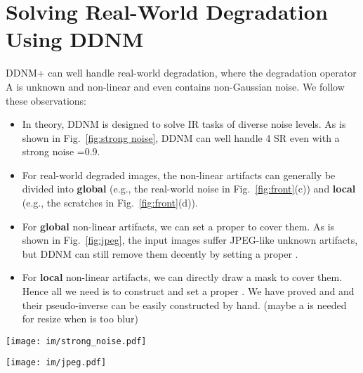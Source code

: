 \documentclass{article} \usepackage{iclr2023_conference,times}
\begin{document}
\section{Solving Real-World Degradation Using DDNM}
\label{cp: Details of Old Photo Restoration}
DDNM+ can well handle real-world degradation, where the degradation operator A is unknown and non-linear and even contains non-Gaussian noise. We follow these observations:
\begin{itemize}
\item In theory, DDNM is designed to solve IR tasks of diverse noise levels. As is shown in Fig.~\ref{fig:strong noise}, DDNM can well handle 4 SR even with a strong noise =0.9. 
\item For real-world degraded images, the non-linear artifacts can generally be divided into \textbf{global} (e.g., the real-world noise in Fig.~\ref{fig:front}(c)) and \textbf{local} (e.g., the scratches in Fig.~\ref{fig:front}(d)).
\item For \textbf{global} non-linear artifacts, we can set a proper  to cover them. As is shown in Fig.~\ref{fig:jpeg}, the input images  suffer JPEG-like unknown artifacts, but DDNM can still remove them decently by setting a proper .
\item For \textbf{local} non-linear artifacts, we can directly draw a mask to cover them. Hence all we need is to construct  and set a proper . We have proved  and  and their pseudo-inverse can be easily constructed by hand. (maybe a  is needed for resize when  is too blur)
\end{itemize}



\begin{figure*}[ht]
  \centering
  \texttt{[image: im/strong\_noise.pdf]}
  \vspace{-0.5cm}
  \caption{DDNM can well handle 4 SR even with a strong noise =0.9.}
\label{fig:strong noise} 
\end{figure*}

\begin{figure*}[ht]
  \centering
  \texttt{[image: im/jpeg.pdf]}
  \vspace{-0.5cm}
  \caption{Solving JPEG-like artifacts using DDNM. Here we set  to exert a pure denoising.  denotes the input degraded image. When we set , the artifacts are decently removed. When we set , the results become smoother but yield relatively poor identity consistency.}
\label{fig:jpeg} 
\end{figure*}
\end{document}

